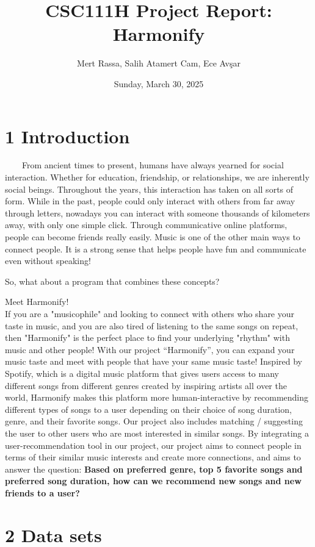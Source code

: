 \documentclass[fontsize=11pt]{article}
\title{CSC111H Project Report: Harmonify}
\author{Mert Rassa, Salih Atamert Cam, Ece Avşar}
\date{Sunday, March 30, 2025}
\numberwithin{equation}{section}
\theoremstyle{plain} %
\theoremstyle{definition}
\theoremstyle{remark}
\begin{document}
\maketitle

\section*{1 Introduction}
  $\qquad $From ancient times to present, humans have always yearned for social interaction. Whether for education, friendship, or relationships, we are inherently social beings. Throughout the years, this interaction has taken on all sorts of form. While in the past, people could only interact with others from far away through letters, nowadays you can interact with someone thousands of kilometers away, with only one simple click. Through communicative online platforms, people can become friends really easily. 
  Music is one of the other main ways to connect people. It is a strong sense that helps people have fun and communicate even without speaking! 

  So, what about a program that combines these concepts? 
  
  Meet Harmonify!
  \\

  If you are a "musicophile" and looking to connect with others who share your taste in music, and you are also tired of listening to the same songs on repeat, then "Harmonify" is the perfect place to find your underlying "rhythm" with music and other people! With our project “Harmonify”, you can expand your music taste and meet with people that have your same music taste! Inspired by Spotify, which is a digital music platform that gives users access to many different songs from different genres created by inspiring artists all over the world, Harmonify makes this platform more human-interactive by recommending different types of songs to a user depending on their choice of song duration, genre, and their favorite songs. Our project also includes matching / suggesting the user to other users who are most interested in similar songs. By integrating a user-recommendation tool in our project, our project aims to connect people in terms of their similar music interests and create more connections, and aims to answer the question: \textbf{Based on preferred genre, top 5 favorite songs and preferred song duration, how can we recommend new songs and new friends to a user?}
\section*{2 Data sets}
\end{document}
